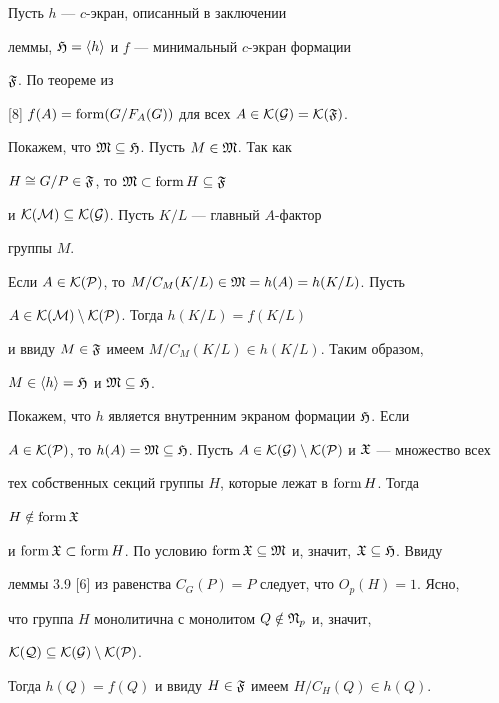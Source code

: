  


\begin{pf} 


Пусть $h$ --- $c$-экран, описанный в заключении 


леммы, $\frak H=\langle h\rangle$ и $f$ --- минимальный $c$-экран формации 


$\frak F$. По теореме из 


[8] $f(A)=\operatorname{form}(G/F_A(G))$ для всех $A\in\cal K(G)=\cal K(\frak F)$. 


 


Покажем, что $\frak M\subseteq\frak H$. Пусть $M\in\frak M$. Так как 


$H\cong G/P\in\frak F$, то $\frak M\subset\operatorname{form} H\subseteq\frak F$ 


и $\cal K(M)\subseteq\cal K(G)$. Пусть $K/L$ --- главный $A$-фактор 


группы $M$. 


Если $A\in\cal K(P)$, то $M/C_M(K/L)\in\frak M=h(A)=h(K/L)$. Пусть 


$A\in\cal K(M)\setminus\cal K(P)$. Тогда $h(K/L)=f(K/L)$ 


и ввиду $M\in\frak F$ имеем $M/C_M(K/L)\in h(K/L)$. Таким образом, 


$M\in\langle h\rangle=\frak H$ и $\frak M\subseteq\frak H$. 


 


Покажем, что $h$ является внутренним экраном формации $\frak H$. Если 


$A\in\cal K(P)$, то $h(A)=\frak M\subseteq\frak H$. Пусть $A\in\cal 


K(G)\setminus\cal K(P)$ и $\frak X$ --- множество всех 


тех собственных секций группы $H$, которые лежат в $\operatorname{form} H$. Тогда 


$H\notin\operatorname{form}\frak X$ 


и $\form\frak X\subset\form H$. По условию $\form\frak X\subseteq\frak 


M$ и, значит, $\frak X\subseteq\frak H$. Ввиду 


леммы 3.9 [6] из равенства $C_G(P)=P$ следует, что $O_p(H)=1$. Ясно, 


что группа $H$ монолитична с монолитом $Q\notin\frak N_p$ и, значит, 


$\cal K(Q)\subseteq\cal K(G)\setminus\cal K(P)$. 


Тогда $h(Q)=f(Q)$ и ввиду $H\in\frak F$ имеем $H/C_H(Q)\in h(Q)$. 



\end{pf}
